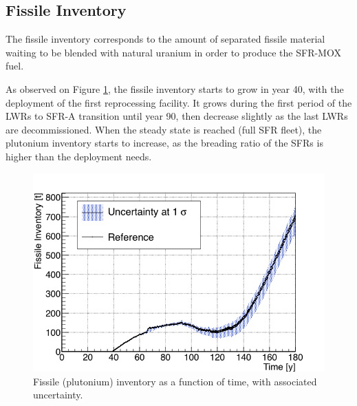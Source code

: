 \documentclass{anstrans}
\begin{document}
\subsection{Fissile Inventory}
The fissile inventory corresponds to the amount of separated fissile material waiting to
be blended with natural uranium in order to produce the \gls{SFR}-\gls{MOX} fuel.

As observed on Figure \ref{fig:pu_full}, the fissile inventory starts to grow in
year 40, with the deployment of the first reprocessing facility.  It grows
during the first period of the \glspl{LWR} to \gls{SFR}-A transition until
year 90, then decrease slightly as the last \glspl{LWR} are decommissioned.
When the steady state is reached (full \gls{SFR} fleet), the plutonium
inventory starts to increase, as the breading ratio of the \glspl{SFR} is higher
than the deployment needs.

\begin{figure}[t] %
    \centering
    \includegraphics[scale=0.3]{pu_full}
    \caption{Fissile (plutonium) inventory as a function of time, with
      associated uncertainty.}\label{fig:pu_full}
\end{figure}
\end{document}
